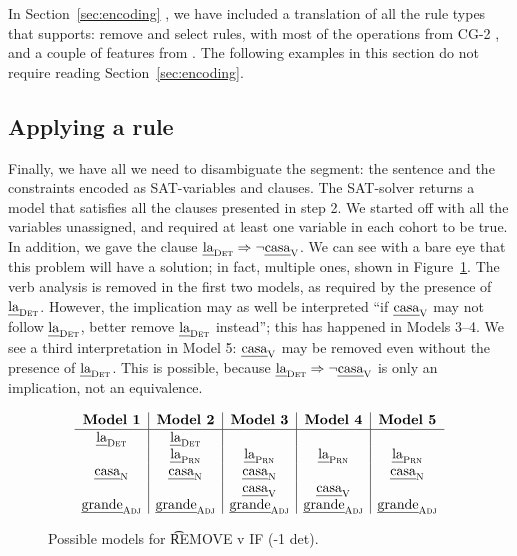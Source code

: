 In Section~\ref{sec:encoding}
, we have included a translation of all the rule types that \satcg{} supports:
{\sc remove} and {\sc select} rules, with most of the operations from CG-2 \cite{tapanainen1996}, and a couple of features from  \cite{vislcg3}.
The following examples in this section do not require reading Section~\ref{sec:encoding}.

\subsection{Applying a rule}


Finally, we have all we need to disambiguate the segment: the sentence and the constraints encoded as SAT-variables and clauses. The SAT-solver returns a model that satisfies all the clauses presented in step 2.
We started off with all the variables unassigned, and required at least one variable
in each cohort to be true. In addition, we gave the clause $\text{\em la}_{\text{\sc Det}} \Rightarrow \neg \text{\em casa}_{\text{\sc V}}$.
We can see with a bare eye that this problem will have a solution; in fact, multiple ones,
shown in Figure~\ref{fig:modelsOneRule}.
The verb analysis is removed in the first two models, as required by the presence of $\text{\em la}_{\text{\sc Det}}$. However, the implication may as well be interpreted ``if $\text{\em casa}_{\text{\sc V}}$ may not follow $\text{\em la}_{\text{\sc Det}}$, better remove $\text{\em la}_{\text{\sc Det}}$ instead''; this has happened in Models 3--4.
We see a third interpretation in Model 5: $\text{\em casa}_{\text{\sc V}}$ may be removed even without
the presence of $\text{\em la}_{\text{\sc Det}}$. This is possible, because $\text{\em la}_{\text{\sc Det}} \Rightarrow \neg \text{\em casa}_{\text{\sc V}}$ is only an implication, not an equivalence.

\begin{figure}[h]
\centering
$$\begin{array}{ c | c | c | c | c}
\textbf{Model 1}  & \textbf{Model 2}  & \textbf{Model 3} & \textbf{Model 4} & \textbf{Model 5} \\ \hline
 \laDet   &  \laDet  &         &        &        \\
          &  \laPrn  & \laPrn  & \laPrn & \laPrn \\
 \casaN   &  \casaN  & \casaN  &        & \casaN \\
          &          & \casaV  & \casaV &         \\
\grandeAdj & \grandeAdj & \grandeAdj & \grandeAdj & \grandeAdj \\

\end{array}$$
\caption{Possible models for \t{REMOVE v IF (-1 det)}.}
\label{fig:modelsOneRule}
\end{figure}


